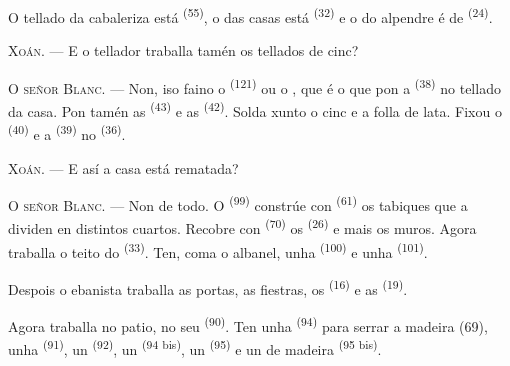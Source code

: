 
O tellado da cabaleriza está  \textsuperscript{(55)}, o das casas
está  \textsuperscript{(32)} e o do alpendre é de
 \textsuperscript{(24)}.

\textsc{Xoán}. --- E o tellador traballa tamén os tellados de cinc?

\textsc{O señor Blanc}. --- Non, iso faino o  \textsuperscript{(121)} ou o
, que é o que pon a  \textsuperscript{(38)} no tellado da
casa. Pon tamén as  \textsuperscript{(43)} e as
 \textsuperscript{(42)}. Solda xunto o cinc e a folla de lata. Fixou
o  \textsuperscript{(40)} e a  \textsuperscript{(39)} no
 \textsuperscript{(36)}.

\textsc{Xoán}. --- E así a casa está rematada?

\VUsaut{3.0mm}
\VUsaut{3.0mm}

\textsc{O señor Blanc}. --- Non de todo. O  \textsuperscript{(99)} constrúe
con  \textsuperscript{(61)} os tabiques que a dividen en distintos cuartos.
Recobre con  \textsuperscript{(70)} os
 \textsuperscript{(26)} e mais os muros. Agora traballa o teito do
 \textsuperscript{(33)}. Ten, coma o albanel, unha 
\textsuperscript{(100)} e unha  \textsuperscript{(101)}.

Despois o ebanista traballa as portas, as fiestras, os  \textsuperscript{(16)}
e as  \textsuperscript{(19)}.

Agora traballa no patio, no seu  \textsuperscript{(90)}. Ten unha
 \textsuperscript{(94)} para serrar a madeira (69), unha
 \textsuperscript{(91)}, un  \textsuperscript{(92)}, un
 \textsuperscript{(94 bis)}, un 
\textsuperscript{(95)} e un  de madeira \textsuperscript{(95 bis)}.

